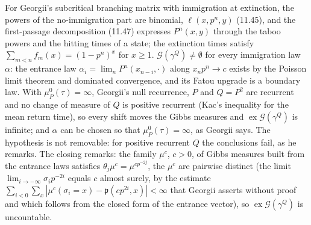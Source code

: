 \begin{theorem}[Georgii (11.43)--(11.47)]
    For Georgii's subcritical branching matrix with immigration at extinction, the powers of the
    no-immigration part are binomial, $\ell(x, p^n, y)$ (11.45), and the first-passage
    decomposition (11.47) expresses $P^n(x,y)$ through the taboo powers and the hitting times of a
    state; the extinction times satisfy $\sum_{m<n} f_m(x) = (1-p^n)^x$ for $x \geq 1$.
    $\mathcal G(\gamma^Q) \neq \emptyset$ for every immigration law $\alpha$: the entrance law
    $\alpha_i = \lim_n P^n(x_{n-i},\cdot)$ along $x_n p^n \to c$ exists by the Poisson limit theorem
    and dominated convergence, and its Fatou upgrade is a boundary law. With $\mu_P^0(\tau) = \infty$,
    Georgii's null recurrence, $P$ and $Q = P^2$ are recurrent and no change of measure of $Q$ is
    positive recurrent (Kac's inequality for the mean return time), so every shift moves the Gibbs
    measures and $\operatorname{ex}\mathcal G(\gamma^Q)$ is infinite; and $\alpha$ can be chosen
    so that $\mu_P^0(\tau) = \infty$, as Georgii says. The hypothesis is not removable: for
    positive recurrent $Q$ the conclusions fail, as he remarks. The closing remarks: the family
    $\mu^c$, $c > 0$, of Gibbs measures built from the entrance laws satisfies
    $\theta_j\mu^c = \mu^{cp^{-2j}}$, the $\mu^c$ are pairwise distinct (the limit
    $\lim_{i\to-\infty}\sigma_i p^{-2i}$ equals $c$ almost surely, by the estimate
    $\sum_{i<0}\sum_x|\mu^c(\sigma_i = x) - \mathfrak p(cp^{2i},x)| < \infty$ that Georgii
    asserts without proof and which follows from the closed form of the entrance vector), so
    $\operatorname{ex}\mathcal G(\gamma^Q)$ is uncountable.
\end{theorem}
